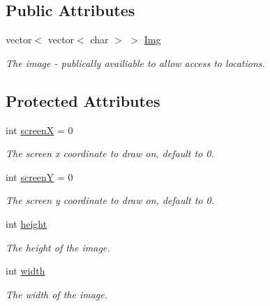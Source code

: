 \subsection*{Public Attributes}
\begin{DoxyCompactItemize}
\item 
\hypertarget{classImage_ac3bad7d8544990b7be9e9c5ee0fb26b8}{vector$<$ vector$<$ char $>$ $>$ \hyperlink{classImage_ac3bad7d8544990b7be9e9c5ee0fb26b8}{Img}}\label{classImage_ac3bad7d8544990b7be9e9c5ee0fb26b8}

\begin{DoxyCompactList}\small\item\em The image -\/ publically availiable to allow access to locations. \end{DoxyCompactList}\end{DoxyCompactItemize}
\subsection*{Protected Attributes}
\begin{DoxyCompactItemize}
\item 
\hypertarget{classImage_a0488098c125477f82fc6ca8e14cc170f}{int \hyperlink{classImage_a0488098c125477f82fc6ca8e14cc170f}{screen\-X} = 0}\label{classImage_a0488098c125477f82fc6ca8e14cc170f}

\begin{DoxyCompactList}\small\item\em The screen x coordinate to draw on, default to 0. \end{DoxyCompactList}\item 
\hypertarget{classImage_a4c5bb89eba006c3768c2f36ef54d2c5b}{int \hyperlink{classImage_a4c5bb89eba006c3768c2f36ef54d2c5b}{screen\-Y} = 0}\label{classImage_a4c5bb89eba006c3768c2f36ef54d2c5b}

\begin{DoxyCompactList}\small\item\em The screen y coordinate to draw on, default to 0. \end{DoxyCompactList}\item 
\hypertarget{classImage_a51df43db420c9c0b57536cb2dd36de5c}{int \hyperlink{classImage_a51df43db420c9c0b57536cb2dd36de5c}{height}}\label{classImage_a51df43db420c9c0b57536cb2dd36de5c}

\begin{DoxyCompactList}\small\item\em The height of the image. \end{DoxyCompactList}\item 
\hypertarget{classImage_ab8d12f635013c04159cd4d3d972bac88}{int \hyperlink{classImage_ab8d12f635013c04159cd4d3d972bac88}{width}}\label{classImage_ab8d12f635013c04159cd4d3d972bac88}

\begin{DoxyCompactList}\small\item\em The width of the image. \end{DoxyCompactList}\end{DoxyCompactItemize}


